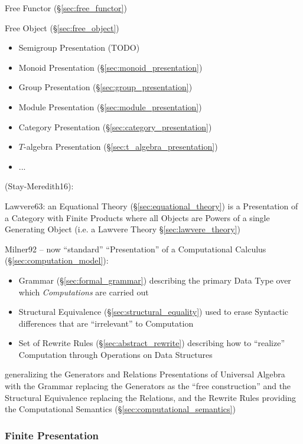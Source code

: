 Free Functor (\S\ref{sec:free_functor})

Free Object (\S\ref{sec:free_object})

\begin{itemize}
  \item Semigroup Presentation (TODO)
  \item Monoid Presentation (\S\ref{sec:monoid_presentation})
  \item Group Presentation (\S\ref{sec:group_presentation})
  \item Module Presentation (\S\ref{sec:module_presentation})
  \item Category Presentation (\S\ref{sec:category_presentation})
  \item $T$-algebra Presentation (\S\ref{sec:t_algebra_presentation})
  \item ...
\end{itemize}

\asterism

(Stay-Meredith16):

Lawvere63: an Equational Theory (\S\ref{sec:equational_theory}) is a
Presentation of a Category with Finite Products where all Objects are Powers of
a single Generating Object (i.e. a Lawvere Theory \S\ref{sec:lawvere_theory})

Milner92 \cite{milner92} -- now ``standard'' ``Presentation'' of a Computational
Calculus (\S\ref{sec:computation_model}):
\begin{itemize}
  \item Grammar (\S\ref{sec:formal_grammar}) describing the primary Data Type
    over which \emph{Computations} are carried out
  \item Structural Equivalence (\S\ref{sec:structural_equality}) used to erase
    Syntactic differences that are ``irrelevant'' to Computation
  \item Set of Rewrite Rules (\S\ref{sec:abstract_rewrite}) describing how to
    ``realize'' Computation through Operations on Data Structures
\end{itemize}
generalizing the Generators and Relations Presentations of Universal Algebra
with the Grammar replacing the Generators as the ``free construction'' and the
Structural Equivalence replacing the Relations, and the Rewrite Rules providing
the Computational Semantics (\S\ref{sec:computational_semantics})



\subsubsection{Finite Presentation}\label{sec:finite_presentation}
\cite{awodey06}

